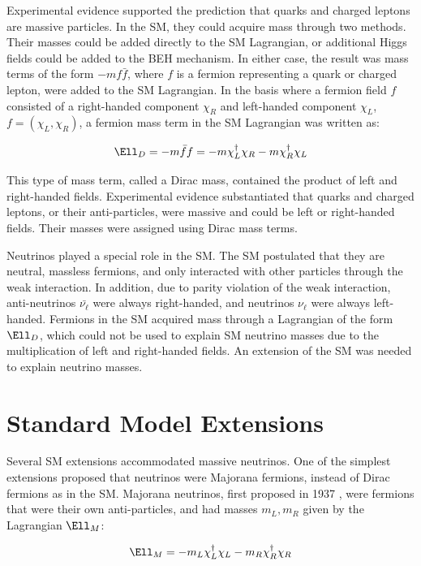 Experimental evidence supported the prediction that quarks and charged leptons are massive particles.  In the SM, they could acquire mass 
through two methods.  Their masses could be added directly to the SM Lagrangian, or additional Higgs fields 
could be added to the BEH mechanism.  In either case, the result was mass terms of the form $-mf\bar{f}$, where $f$ is a fermion 
representing a quark or charged lepton, were added to the SM Lagrangian.  In the basis where a 
fermion field $f$ consisted of a right-handed component $\chi_{R}$ and left-handed 
component $\chi_{L}$, $f = (\chi_{L},\chi_{R})$, a fermion mass term in the SM Lagrangian was written as:

\begin{equation}
	\Ell_{D} = -m\bar{f}f = -m\chi^{\dagger}_{L}\chi_{R} - m\chi^{\dagger}_{R}\chi_{L}
\end{equation}

This type of mass term, called a Dirac mass, contained the product of left and right-handed fields.  Experimental 
evidence substantiated that quarks and charged leptons, or their anti-particles, were massive and could be left or right-handed 
fields.  Their masses were assigned using Dirac mass terms.

Neutrinos played a special role in the SM.  The SM postulated that they are neutral, massless fermions, and only interacted 
with other particles through the weak interaction.  In addition, due to parity violation of the weak interaction, 
anti-neutrinos $\bar{\nu_{\ell}}$ were always right-handed, and neutrinos $\nu_{\ell}$ were always left-handed.  Fermions in 
the SM acquired mass through a Lagrangian of the form $\Ell_{D}$, which could not be used to explain SM neutrino masses 
due to the multiplication of left and right-handed fields.  An extension of the SM was needed to explain neutrino masses.


\section{Standard Model Extensions}
\label{sec:lrsExtensions}
Several SM extensions accommodated massive neutrinos.  One of the simplest extensions proposed that neutrinos 
were Majorana fermions, instead of Dirac fermions as in the SM.  Majorana neutrinos, first proposed 
in 1937 \cite{majoranaTheory}, were fermions that were their own anti-particles, and had masses 
$m_{L},m_{R}$ given by the Lagrangian $\Ell_{M}$:

\begin{equation}
	\Ell_{M} = -m_{L}\chi^{\dagger}_{L}\chi_{L} - m_{R}\chi^{\dagger}_{R}\chi_{R}
\end{equation}

